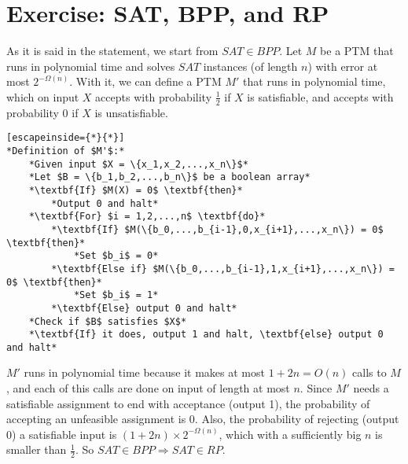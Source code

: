 \documentclass[a4paper, 10pt]{article}
\begin{document}
\section{Exercise: SAT, BPP, and RP}
As it is said in the statement, we start from $SAT \in BPP$. Let $M$ be a PTM that runs in polynomial time and solves $SAT$ instances (of length $n$) with error at most $2^{-\Omega(n)}$. With it, we can define a PTM $M'$ that runs in polynomial time, which on input $X$ accepts with probability $\frac{1}{2}$ if $X$ is satisfiable, and accepts with probability 0 if $X$ is unsatisfiable.

\begin{lstlisting}[escapeinside={*}{*}]
*Definition of $M'$:*
    *Given input $X = \{x_1,x_2,...,x_n\}$*
    *Let $B = \{b_1,b_2,...,b_n\}$ be a boolean array*
    *\textbf{If} $M(X) = 0$ \textbf{then}*
        *Output 0 and halt*
    *\textbf{For} $i = 1,2,...,n$ \textbf{do}*
        *\textbf{If} $M(\{b_0,...,b_{i-1},0,x_{i+1},...,x_n\}) = 0$ \textbf{then}*
            *Set $b_i$ = 0*
        *\textbf{Else if} $M(\{b_0,...,b_{i-1},1,x_{i+1},...,x_n\}) = 0$ \textbf{then}*
            *Set $b_i$ = 1*
        *\textbf{Else} output 0 and halt*
    *Check if $B$ satisfies $X$*
    *\textbf{If} it does, output 1 and halt, \textbf{else} output 0 and halt*
\end{lstlisting}

$M'$ runs in polynomial time because it makes at most $1+2n =  O(n)$ calls to $M$, and each of this calls are done on input of length at most $n$. Since $M'$ needs a satisfiable assignment to end with acceptance (output 1), the probability of accepting an unfeasible assignment is 0. Also, the probability of rejecting (output 0) a satisfiable input is $(1+2n)\times 2^{-\Omega(n)}$, which with a sufficiently big $n$ is smaller than $\frac{1}{2}$. So $SAT \in BPP \Rightarrow SAT \in RP$.
\end{document}
